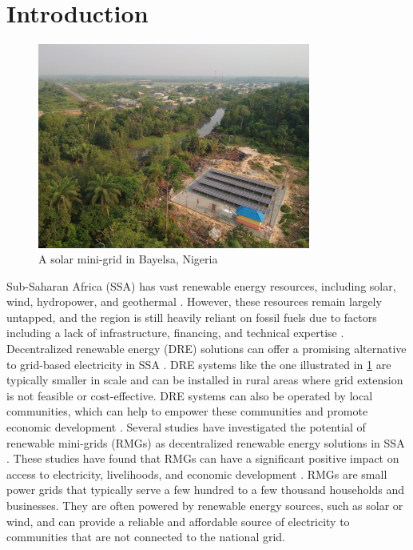 \section{Introduction}
\label{sec:intro}
\begin{figure}[th]
    \centering
    \includegraphics[width=0.8\textwidth]{images/mini-grid-bayelsa.jpg}
    \caption{A solar mini-grid in Bayelsa, Nigeria}
    \label{fig:mini-grid}
\end{figure}

Sub-Saharan Africa (SSA) has vast renewable energy resources, including solar, wind, hydropower, and geothermal \cite{hafner2018prospects}. However, these resources remain largely untapped, and the region is still heavily reliant on fossil fuels due to factors including a lack of infrastructure, financing, and technical expertise \cite{irena2022renewable}. Decentralized renewable energy (DRE) solutions can offer a promising alternative to grid-based electricity in SSA \cite{moro2018ensuring, rasagam2018delivering}.  DRE systems like the one illustrated in \cref{fig:mini-grid} are typically smaller in scale and can be installed in rural areas where grid extension is not feasible or cost-effective. DRE systems can also be operated by local communities, which can help to empower these communities and promote economic development \cite{deshmukh2009role, edwards2018role}.
Several studies have investigated the potential of renewable mini-grids (RMGs) as decentralized renewable energy solutions in SSA \cite{rabetanetiarimanana2018pv, okunlola2018assessment, moner2018electrification}. These studies have found that RMGs can have a significant positive impact on access to electricity, livelihoods, and economic development \cite{dawoud2018hybrid}. RMGs are small power grids that typically serve a few hundred to a few thousand households and businesses. They are often powered by renewable energy sources, such as solar or wind, and can provide a reliable and affordable source of electricity to communities that are not connected to the national grid.

